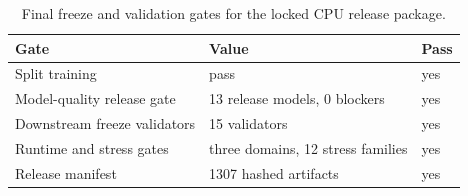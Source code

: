 \begin{table}[htbp]
\centering
\small
\caption{Final freeze and validation gates for the locked CPU release package.}
\label{tbl:final-freeze-validation}
\begin{tabular}{lll}
\toprule
Gate & Value & Pass\\
\midrule
Split training & pass & yes\\
Model-quality release gate & 13 release models, 0 blockers & yes\\
Downstream freeze validators & 15 validators & yes\\
Runtime and stress gates & three domains, 12 stress families & yes\\
Release manifest & 1307 hashed artifacts & yes\\
\bottomrule
\end{tabular}
\end{table}
